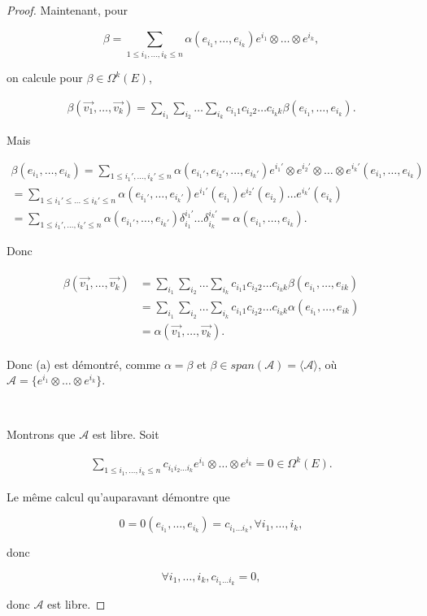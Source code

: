 \documentclass[french]{article}
\theoremstyle{definition}
\begin{document}
\begin{proof}
  Maintenant, pour

  \[
  \beta = \sum_{1 \leq i_1, \dots, i_k \leq n}^{} \alpha(e_{i_1}, \dots,  e_{i_k}) e ^{i_1}\otimes \dots \otimes e ^{i_k},
  \]

  on calcule pour $\beta  \in \Omega ^{k}(E)$,

  \begin{gather*}
    \beta (\vec{ v_1 }, \dots, \vec{ v_k })= \sum_{i_1}^{} \sum_{i_2}^{} \dots \sum_{i_k}^{} c _{i_1 1} c _{i_2 2} \dots c _{i_k k} \beta(e _{i_1}, \dots, e _{i_k}).
  \end{gather*}

  Mais

  \begin{gather*}
    \beta (e _{i_1}, \dots, e _{i_k}) = \sum_{1 \leq i_1', \dots, i_k' \leq n}^{} \alpha( e _{i_1'}, e _{i_2'}, \dots, e _{i_k'}) e ^{i_1'}\otimes e ^{i_2'} \otimes \dots \otimes e ^{i_k'} (e_{i_1},\dots, e_{i_k}) \\
    = \sum_{1 \leq i_1' \leq \dots \leq i_k' \leq n}^{} \alpha(e _{i_1'}, \dots, e _{i_k'}) e ^{i_1'}(e _{i_1}) e ^{i_2'}(e _{i_2}) \dots e ^{i_k'} (e _{i_k}) \\
    =\sum_{1 \leq i_1', \dots, i_k' \leq n}^{} \alpha(e _{i_1'}, \dots, e _{i_k'}) \delta _{i_1} ^{i_1'} \dots \delta _{i_k} ^{i_k'} = \alpha(e _{i_1}, \dots, e _{i_k}).
  \end{gather*}

  Donc

  \begin{gather*}
  \begin{aligned}
    \beta (\vec{ v_1 }, \dots, \vec{ v_k }  ) & = \sum_{i_1}^{} \sum_{i_2}^{} \dots \sum_{i_k}^{} c _{i_1 1} c _{i_2 2} \dots c _{i_k k} \beta(e _{i_1}, \dots, e _{ik})   \\ &  = \sum_{i_1}^{} \sum_{i_2}^{} \dots \sum_{i_k}^{} c _{i_1 1} c _{i_2 2} \dots c _{i_k k} \alpha(e _{i_1}, \dots, e _{ik}) \\ & =\alpha(\vec{ v_1 }, \dots, \vec{ v_k }  )   .
\end{aligned}
  \end{gather*}

  Donc (a) est démontré, comme $\alpha = \beta$ et $\beta \in span(\mathscr{A} ) = \langle \mathscr{A} \rangle $, où $\mathscr{A} = \{ e ^{i_1} \otimes \dots \otimes e ^{i_k}\} $.

  \

  Montrons que $\mathscr{A} $ est libre. Soit

  \begin{gather*}
    \sum_{1 \leq i_1 , \dots, i_k \leq n}^{} c _{i_1 i_2 \dots i_k}  e ^{i_1} \otimes \dots \otimes e ^{i_k} = 0 \in \Omega ^{k}(E).
  \end{gather*}

  Le même calcul qu'auparavant démontre que

  \[
  0 = 0(e _{i_1}, \dots, e _{i_k}) = c _{i_1 \dots i_k}, \forall i_1, \dots, i_k,
  \]

  donc

  \[
  \forall i_1, \dots, i_k, c _{i_1 \dots i_k} =0,
  \]

  donc $\mathscr{A} $ est libre.
\end{proof}
\end{document}
